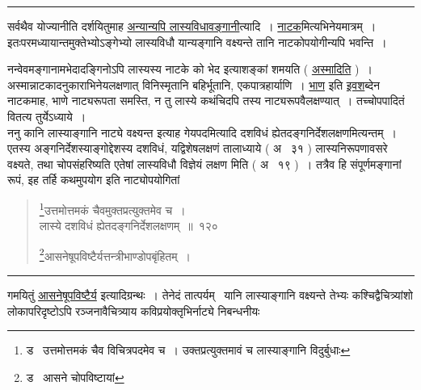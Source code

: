 \documentclass[11pt, openany]{book}
\begin{document}
\hrule

\vspace{2mm}
\begin{sloppypar}
\noindent
सर्वथैव योज्यानीति दर्शयितुमाह \underline{अन्यान्यपि लास्यविधावङ्गानी}त्यादि~। \underline{नाटक}मित्यभिनेयमात्रम्~। इतःपरमध्यायान्तमुक्तेभ्योऽङ्गेभ्यो लास्यविधौ यान्यङ्गानि वक्ष्यन्ते तानि नाटकोपयोगीन्यपि भवन्ति~।\\
\end{sloppypar}

नन्वेवमङ्गानामभेदादङ्गिनोऽपि लास्यस्य नाटके को भेद इत्याशङ्कां शमयति ( \underline{अस्मादिति} )~। अस्मान्नाटकादनुकाराभिनेयलक्षणात् विनिस्मृतानि बहिर्भूतानि, एकपात्रहार्याणि~। \underline{भाण} इति \underline{इवश}ब्देन नाटकमाह, भाणे नाट्यरूपता समस्ति, न तु लास्ये कथंचिदपि तस्य नाट्यरूपवैलक्षण्यात्~। तच्चोपपादितं वितत्य तुर्येऽध्याये~।\\

ननु कानि लास्याङ्गानि नाट्ये वक्ष्यन्त इत्याह गेयपदमित्यादि दशविधं ह्येतदङ्गनिर्देशलक्षणमित्यन्तम्~। एतस्य अङ्गनिर्देशस्याङ्गोद्देशस्य दशविधं, यद्विशेषलक्षणं तालाध्याये ( अ \textendash\ ३१ ) लास्यनिरूपणावसरे वक्ष्यते, तथा चोपसंहरिष्यति {\qt एतेषां लास्यविधौ विज्ञेयं लक्षण} मिति ( अ \textendash\ १९ )~। तत्रैव हि संपूर्णमङ्गानां रूपं, इह तर्हि कथमुपयोग इति नाट्योपयोगितां

\newpage

\begin{quote}
{\na \renewcommand{\thefootnote}{1}\footnote{ड \textendash\ उत्तमोत्तमकं चैव विचित्रपदमेव च~। उक्तप्रत्युक्तमावं च लास्याङ्गानि विदुर्बुधाः}उत्तमोत्तमकं चैवमुक्तप्रत्युक्तमेव च~।\\
लास्ये दशविधं ह्येतदङ्गनिर्देशलक्षणम्~॥~१२०

\renewcommand{\thefootnote}{2}\footnote{ड \textendash\ आसने चोपविष्टायां}आसनेषूपविष्टैर्यत्तन्त्रीभाण्डोपबृंहितम्~।}
\end{quote}

\hrule

\vspace{2mm}
\noindent
गमयितुं \underline{आसनेषूपविष्टैर्य} इत्यादिग्रन्थः~। तेनेदं तात्पर्यम् \textendash\ यानि लास्याङ्गानि वक्ष्यन्ते तेभ्यः कश्चिद्वैचित्र्यांशो लोकापरिदृष्टोऽपि रञ्जनावैचित्र्याय कविप्रयोक्तृभिर्नाट्ये निबन्धनीयः\\
\end{document}
